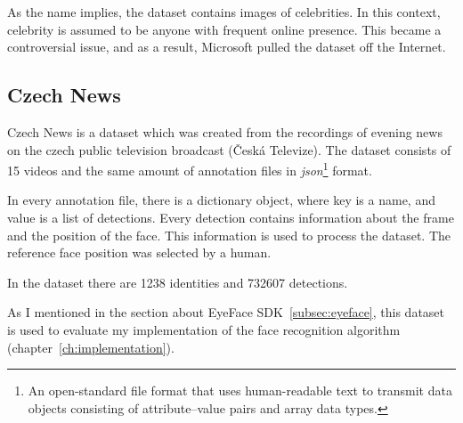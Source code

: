 As the name implies, the dataset contains images of celebrities.
In this context, celebrity is assumed to be anyone with frequent online presence.
This became a controversial issue, and as a result, Microsoft pulled the dataset off the Internet.

\subsection{Czech News}\label{subsec:czenew}
Czech News is a dataset which was created from the recordings of evening news on the czech public television broadcast
(Česká Televize).
The dataset consists of 15 videos and the same amount of annotation files in \textit{json}\footnote{An
open-standard file format that uses human-readable text to transmit data objects consisting of attribute–value pairs
and array data types.} format.

In every annotation file, there is a dictionary object, where key is a name, and value is a list of detections.
Every detection contains information about the frame and the position of the face.
This information is used to process the dataset.
The reference face position was selected by a human.

In the dataset there are 1238 identities and 732607 detections.

As I mentioned in the section about EyeFace SDK~\ref{subsec:eyeface}, this dataset is used to evaluate my
implementation of the face recognition algorithm (chapter~\ref{ch:implementation}).